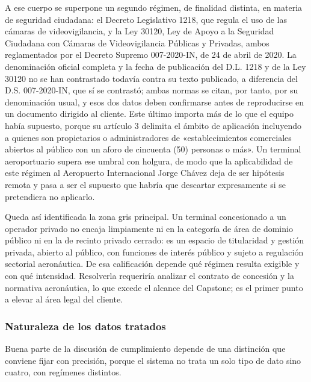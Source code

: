 A ese cuerpo se superpone un segundo régimen, de finalidad distinta, en
materia de seguridad ciudadana: el Decreto Legislativo 1218, que regula
el uso de las cámaras de videovigilancia, y la Ley 30120, Ley de Apoyo a
la Seguridad Ciudadana con Cámaras de Videovigilancia Públicas y
Privadas, ambos reglamentados por el Decreto Supremo 007-2020-IN, de 24
de abril de 2020. La denominación oficial completa y la fecha de
publicación del D.L. 1218 y de la Ley 30120 no se han contrastado
todavía contra su texto publicado, a diferencia del D.S. 007-2020-IN,
que sí se contrastó; ambas normas se citan, por tanto, por su
denominación usual, y esos dos datos deben confirmarse antes de
reproducirse en un documento dirigido al cliente. Este último importa
más de lo que el equipo había supuesto, porque su artículo 3 delimita el
ámbito de aplicación incluyendo a quienes son propietarios o
administradores de «establecimientos comerciales abiertos al público con
un aforo de cincuenta (50) personas o más». Un terminal aeroportuario
supera ese umbral con holgura, de modo que la aplicabilidad de este
régimen al Aeropuerto Internacional Jorge Chávez deja de ser hipótesis
remota y pasa a ser el supuesto que habría que descartar expresamente si
se pretendiera no aplicarlo. 

Queda así identificada la zona gris principal. Un terminal concesionado
a un operador privado no encaja limpiamente ni en la categoría de área
de dominio público ni en la de recinto privado cerrado: es un espacio de
titularidad y gestión privada, abierto al público, con funciones de
interés público y sujeto a regulación sectorial aeronáutica. De esa
calificación depende qué régimen resulta exigible y con qué intensidad.
Resolverla requeriría analizar el contrato de concesión y la normativa
aeronáutica, lo que excede el alcance del Capstone; es el primer punto a
elevar al área legal del cliente.

\subsubsection{Naturaleza de los datos tratados}

Buena parte de la discusión de cumplimiento depende de una distinción
que conviene fijar con precisión, porque el sistema no trata un solo
tipo de dato sino cuatro, con regímenes distintos.

